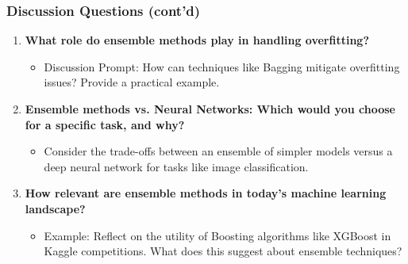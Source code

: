 \documentclass[aspectratio=169]{beamer}
\begin{document}
\begin{frame}[fragile]
    \frametitle{Discussion Questions (cont'd)}
    \begin{enumerate}[resume]
        \item \textbf{What role do ensemble methods play in handling overfitting?}
        \begin{itemize}
            \item Discussion Prompt: How can techniques like Bagging mitigate overfitting issues? Provide a practical example.
        \end{itemize}
        
        \item \textbf{Ensemble methods vs. Neural Networks: Which would you choose for a specific task, and why?}
        \begin{itemize}
            \item Consider the trade-offs between an ensemble of simpler models versus a deep neural network for tasks like image classification.
        \end{itemize}

        \item \textbf{How relevant are ensemble methods in today's machine learning landscape?}
        \begin{itemize}
            \item Example: Reflect on the utility of Boosting algorithms like XGBoost in Kaggle competitions. What does this suggest about ensemble techniques?
        \end{itemize}
    \end{enumerate}
\end{frame}
\end{document}
